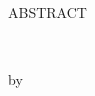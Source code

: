 \thispagestyle{empty}
\begin{center}
\MakeUppercase{ABSTRACT}\\
\vspace*{1\baselineskip}

\MakeUppercase{\thetitle}\\
\vspace*{2\baselineskip}

by \theauthor
\end{center}

\vspace*{4\baselineskip}

\begin{flushleft}
\end{flushleft}
\clearpage